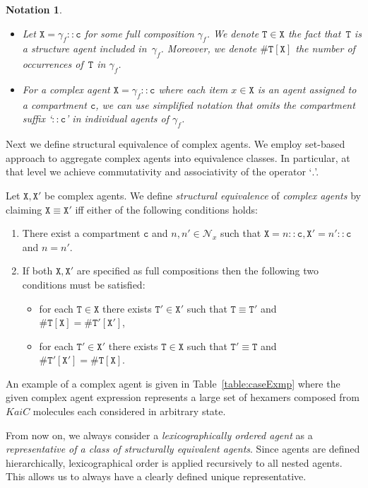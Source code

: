\documentclass{entcs}
\renewcommand{\~}[0]{\texttildelow}
\newtheorem{notation}[thm]{Notation}
\begin{document}
\begin{notation}
~
\begin{itemize}
\item Let $\mathtt{X}=\gamma_f::\mathtt{c}$ for some full composition $\gamma_f$. We denote $\mathtt{T}\in \mathtt{X}$ the fact that~$\mathtt{T}$ is a structure agent included in~$\gamma_f$. 
Moreover, we denote $\#\mathtt{T}[\mathtt{X}]$ the number of occurrences of~$\mathtt{T}$ in $\gamma_f$. 
\item For a complex agent $\mathtt{X}=\gamma_f::\mathtt{c}$ where each item $x\in\mathtt{X}$ is an agent assigned to a compartment $\mathtt{c}$, we can use simplified notation that omits the compartment suffix `$::\mathtt{c}$' in individual agents of $\gamma_f$.
\end{itemize}
\end{notation}

Next we define structural equivalence of complex agents. We employ set-based approach to aggregate complex agents into equivalence classes. In particular, at that level we achieve commutativity and associativity of the operator `$.$'.  

\begin{defn}
Let $\mathtt{X},\mathtt{X}'$ be complex agents. We define \emph{structural equivalence} of \emph{complex agents} by claiming $\mathtt{X}\equiv\mathtt{X}'$ iff either of the following conditions holds:
\begin{enumerate}
\item There exist a compartment $\mathtt{c}$ and $n,n'\in\mathcal{N}_x$ such that $\mathtt{X}=n::\mathtt{c},\mathtt{X}'=n'::\mathtt{c}$ and $n=n'$.
\item If both $\mathtt{X},\mathtt{X}'$ are specified as full compositions then the following two conditions must be satisfied:

\begin{itemize}
\item for each $\mathtt{T}\in\mathtt{X}$ there exists $\mathtt{T}'\in\mathtt{X}'$ such that  $\mathtt{T}\equiv\mathtt{T}'$ and $\#\mathtt{T}[\mathtt{X}]=\#\mathtt{T}'[\mathtt{X}']$,
\item for each $\mathtt{T}'\in\mathtt{X}'$ there exists $\mathtt{T}\in\mathtt{X}$ such that  $\mathtt{T}'\equiv\mathtt{T}$ and $\#\mathtt{T}'[\mathtt{X}']=\#\mathtt{T}[\mathtt{X}]$.
\end{itemize}
\end{enumerate}
\end{defn}

An example of a complex agent is given in Table~\ref{table:caseExmp} where the given complex agent expression represents a large set of hexamers composed from $KaiC$ molecules each considered in arbitrary state.  

\begin{remark}
From now on, we always consider a \emph{lexicographically ordered agent} as a \emph{representative of a class of structurally equivalent agents}. Since agents are defined hierarchically, lexicographical order is applied recursively to all nested agents. This allows us to always have a clearly defined unique representative.
\end{remark}
\end{document}
